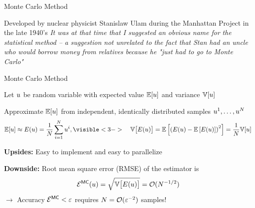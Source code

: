 \def\name{Monte Carlo Method}

\begin{frame}{\name{}}
    \vspace{1em}
    \begin{block}{}
        \small
        Developed by nuclear physicist Stanislaw Ulam during the Manhattan Project in the late 1940's\vskip5mm
        {\itshape It was at that time that I suggested an obvious name for the statistical method -- a suggestion not unrelated to the fact that Stan had an uncle who would borrow money from relatives because he "just had to go to Monte Carlo"}\vskip5mm
        \hspace*{}
    \end{block}
\end{frame}

\begin{frame}{\name{}}
    \begin{overlayarea}{\textwidth}{\frameheight}
        \vspace{1em}
        \begin{squarelist}
            \item<1-> Let $u$ be random variable with expected value $\mathbb{E}[u]$ and variance $\mathbb{V}[u]$
            \item<2-> Approximate $\mathbb{E}[u]$ from independent, identically distributed samples $u^1, \dots, u^N$ 
                \begin{align*}
                    \expect[\un] \approx \expecta(\un) = \frac{1}{\nsamp}\sum_{i = 1}^\nsamp \un^i,
                    \visible<3->{\quad \var\big[\expecta(\un)\big] = \expect\left[\left(\expecta(\un) - \expect\left[\expecta(u)\right]\right)^2\right] =  \frac{1}{\nsamp}\var[\un]}
                \end{align*}
            \item<4-> \textbf{Upsides:} Easy to implement and easy to parallelize\\
            \item<5-> \textbf{Downside:} Root mean square error (RMSE) of the estimator is
                \begin{equation*}
                    \mathcal{E}^{\mathsf{MC}}(u) = \sqrt{\mathbb{V}\big[E(u)\big]} = \mathcal{O}(N^{-1/2})
                \end{equation*}
                $\rightarrow$ Accuracy $\mathcal{E}^{\mathsf{MC}} < \varepsilon$ requires $N = \mathcal{O}(\varepsilon^{-2})$ samples!
        \end{squarelist}
    \end{overlayarea}
\end{frame}

